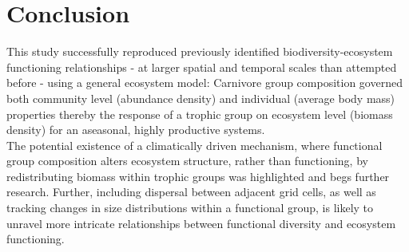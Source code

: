 \chapter{Conclusion}
This study successfully reproduced previously identified biodiversity-ecosystem functioning relationships - at larger spatial and temporal scales than attempted before - using a general ecosystem model:
Carnivore group composition governed both community level (abundance density) and individual (average body mass) properties thereby the response of a trophic group on ecosystem level (biomass density) for an aseasonal, highly productive systems. \\ 
The potential existence of a climatically driven mechanism, where functional group composition alters ecosystem structure, rather than functioning, by redistributing biomass within trophic groups was highlighted and begs further research.
Further, including dispersal between adjacent grid cells, as well as tracking changes in size distributions within a functional group, is likely to unravel more intricate relationships between functional diversity and ecosystem functioning.\\\\
